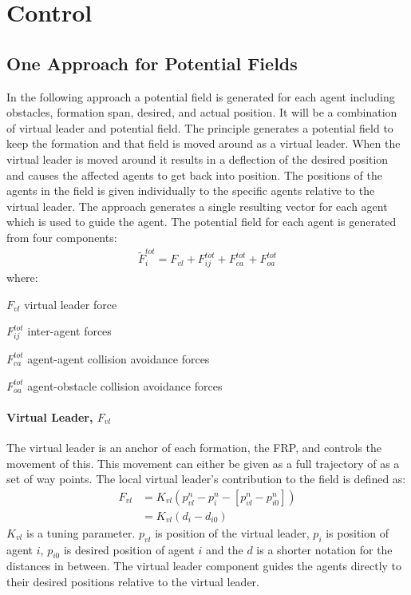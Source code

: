 \chapter{Control}
\label{ch:control}




\section{One Approach for Potential Fields}
In the following approach a potential field is generated for each
agent including obstacles, formation span, desired, and actual
position.  It will be a combination of virtual leader and potential
field. The principle generates a potential field to keep the formation
and that field is moved around as a virtual leader. When the virtual
leader is moved around it results in a deflection of the desired
position and causes the affected agents to get back into position. The
positions of the agents in the field is given individually to the
specific agents relative to the virtual leader. The approach generates
a single resulting vector for each agent which is used to guide the
agent. The potential field for each agent is generated from four
components:
\begin{align}
\tilde{F}_i^{tot} = F_{vl}+F_{ij}^{tot}+F_{ca}^{tot}+F_{oa}^{tot}
\end{align}
where:
\begin{ffk}
\firmlist%
\item[$F_{vl}$] virtual leader force
\item[$F_{ij}^{tot}$] inter-agent forces
\item[$F_{ca}^{tot}$] agent-agent collision avoidance forces
\item[$F_{oa}^{tot}$] agent-obstacle collision avoidance forces
\end{ffk}

\subsubsection{Virtual Leader, $F_{vl}$}
The virtual leader is an anchor of each formation, the \ac{FRP}, and
controls the movement of this. This movement can either be given as a
full trajectory of as a set of way points. The local virtual leader's
contribution to the field is defined as:
\begin{align}
F_{vl} &= K_{vl}(p_{vl}^n-p_i^n-[p_{vl}^n-p_{i0}^n])\\
&= K_{vl}(d_i-d_{i0})
\end{align}
$K_{vl}$ is a tuning parameter. $p_{vl}$ is position of the virtual
leader, $p_i$ is position of agent $i$, $p_{i0}$ is desired position
of agent $i$ and the $d$ is a shorter notation for the distances in
between. The virtual leader component guides the agents directly to
their desired positions relative to the virtual leader.

